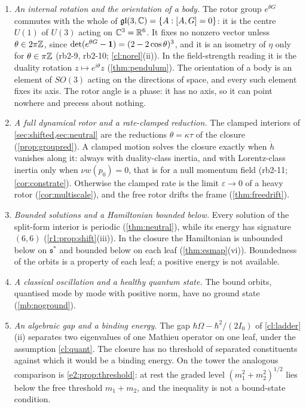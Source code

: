 \begin{enumerate}[label=(\arabic*),leftmargin=2.2em]
\item \emph{An internal rotation and the orientation of a body.} The rotor group $e^{\theta G}$ commutes with the whole of
$\mathfrak{gl}(3,\mathbb{C})=\{A:[A,G]=0\}$: it is the centre $U(1)$ of $U(3)$ acting on $\mathbb{C}^3=\mathbb{R}^6$. It fixes no nonzero vector unless
$\theta\in2\pi\mathbb{Z}$, since $\det(e^{\theta G}-\mathbf 1)=(2-2\cos\theta)^3$, and it is an isometry of $\eta$ only for $\theta\in\pi\mathbb{Z}$ (rb2-9, rb2-10;
\cref{cl:norel}(ii)). In the field-strength reading it is the duality rotation $z\mapsto e^{i\theta}z$ (\cref{thm:pendulum}). The orientation of a
body is an element of $SO(3)$ acting on the directions of space, and every such element fixes its axis. The rotor angle is a phase: it has no
axis, so it can point nowhere and precess about nothing.
\item \emph{A full dynamical rotor and a rate-clamped reduction.} The clamped interiors of \cref{sec:shifted,sec:neutral} are the reductions
$\theta=\kappa\tau$ of the closure (\cref{prop:groupred}). A clamped motion solves the closure exactly when $\dot h$ vanishes along it: always with
duality-class inertia, and with Lorentz-class inertia only when $\nu w(p_0)=0$, that is for a null momentum field (rb2-11; \cref{cor:constrate}).
Otherwise the clamped rate is the limit $\varepsilon\to0$ of a heavy rotor (\cref{cor:multiscale}), and the free rotor drifts the frame
(\cref{thm:freedrift}).
\item \emph{Bounded solutions and a Hamiltonian bounded below.} Every solution of the split-form interior is periodic (\cref{thm:neutral}), while
its energy has signature $(6,6)$ (\cref{r1:prop:shift}(iii)). In the closure the Hamiltonian is unbounded below on $\mathfrak s^*$ and bounded below on
each leaf (\cref{thm:esmap}(vi)). Boundedness of the orbits is a property of each leaf; a positive energy is not available.
\item \emph{A classical oscillation and a healthy quantum state.} The bound orbits, quantised mode by mode with positive norm, have no ground state
(\cref{mb:noground}).
\item \emph{An algebraic gap and a binding energy.} The gap $\hbar\Omega-\hbar^2/(2I_0)$ of \cref{cl:ladder}(ii) separates two eigenvalues of one
Mathieu operator on one leaf, under the assumption \cref{cl:quant}. The closure has no threshold of separated constituents against which it
would be a binding energy. On the tower the analogous comparison is \cref{e2:prop:threshold}: at rest the graded level $(m_1^2+m_2^2)^{1/2}$ lies below
the free threshold $m_1+m_2$, and the inequality is not a bound-state condition.
\end{enumerate}

